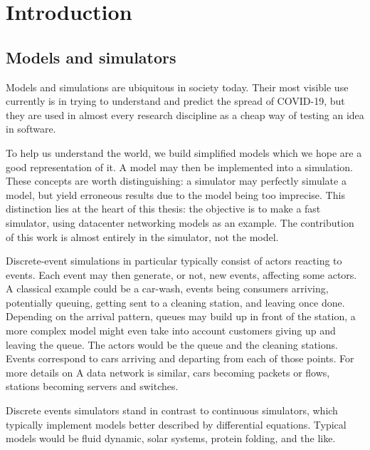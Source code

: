 \chapter{Introduction} \label{intro}

\section{Models and simulators}
Models and simulations are ubiquitous in society today.
Their most visible use currently is in trying to understand and predict the spread of COVID-19, but they are used in almost every research discipline as a cheap way of testing an idea in software.

To help us understand the world, we build simplified models which we hope are a good representation of it.
A model may then be implemented into a simulation.
These concepts are worth distinguishing: a simulator may perfectly simulate a model, but yield erroneous results due to the model being too imprecise.
This distinction lies at the heart of this thesis: the objective is to make a fast simulator, using datacenter networking models as an example.
The contribution of this work is almost entirely in the simulator, not the model.

Discrete-event simulations in particular typically consist of actors reacting to events.
Each event may then generate, or not, new events, affecting some actors.
A classical example could be a car-wash, events being consumers arriving, potentially queuing, getting sent to a cleaning station, and leaving once done.
Depending on the arrival pattern, queues may build up in front of the station, a more complex model might even take into account customers giving up and leaving the queue. %
The actors would be the queue and the cleaning stations. Events correspond to cars arriving and departing from each of those points.
For more details on 
A data network is similar, cars becoming packets or flows, stations becoming servers and switches.

Discrete events simulators stand in contrast to continuous simulators, which typically implement models better described by differential equations.
Typical models would be fluid dynamic, solar systems, protein folding, and the like. %